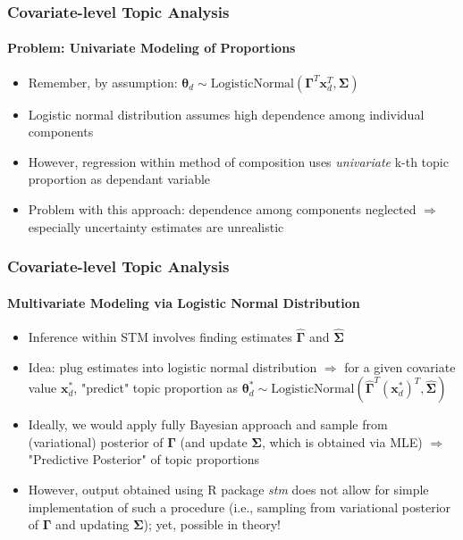 \documentclass[xcolor=dvipsnames]{beamer}
\begin{document}
\begin{frame}
\frametitle{Covariate-level Topic Analysis}
\framesubtitle{Problem: Univariate Modeling of Proportions}
\begin{itemize}
\item Remember, by assumption: $\boldsymbol{\theta}_d \sim \text{LogisticNormal}(\boldsymbol{\Gamma}^T\boldsymbol{x}_d^T, \boldsymbol{\Sigma})$
\item Logistic normal distribution assumes high dependence among individual components
\item However, regression within method of composition uses \textit{univariate} k-th topic proportion as dependant variable 
\item Problem with this approach: dependence among components neglected $\Rightarrow$ especially uncertainty estimates are unrealistic
\end{itemize}
\end{frame}

\begin{frame}
\frametitle{Covariate-level Topic Analysis}
\framesubtitle{Multivariate Modeling via Logistic Normal Distribution}
\begin{itemize}
\item Inference within STM involves finding estimates $\hat{\boldsymbol{\Gamma}}$ and $\hat{\boldsymbol{\Sigma}}$
\item Idea: plug estimates into logistic normal distribution $\Rightarrow$ for a given covariate value $\boldsymbol{x}^*_d$, "predict" topic proportion as
$\boldsymbol{\theta}^*_d \sim \text{LogisticNormal}(\hat{\boldsymbol{\Gamma}}^T(\boldsymbol{x}_d^*)^T, \hat{\boldsymbol{\Sigma}})$
\item Ideally, we would apply fully Bayesian approach and sample from (variational) posterior of $\boldsymbol{\Gamma}$ (and update $\boldsymbol{\Sigma}$, which is obtained via MLE) $\Rightarrow$ "Predictive Posterior" of topic proportions
\item However, output obtained using R package \textit{stm} does not allow for simple implementation of such a procedure (i.e., sampling from variational posterior of $\boldsymbol{\Gamma}$ and updating $\boldsymbol{\Sigma}$); yet, possible in theory!
\end{itemize}
\end{frame}
\end{document}
